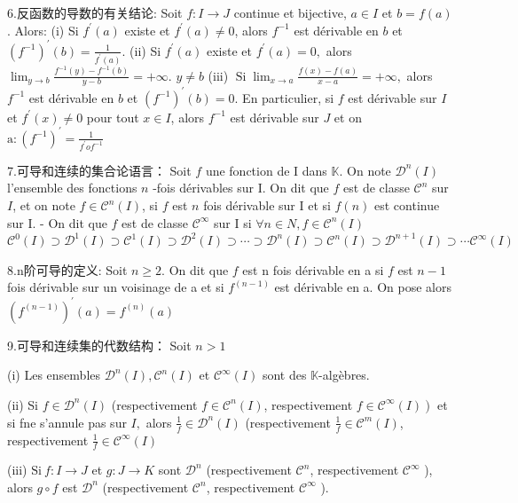 \documentclass[12pt]{book}
\theoremstyle{definition}\newtheorem{dfn}{Définition}[chapter]
\theoremstyle{plain}\newtheorem{thm}{Théorème}[chapter]
\theoremstyle{plain}\newtheorem{prp}{Proposition}[chapter]
\theoremstyle{plain}\newtheorem{lem}{\bf Lemme}[chapter]
\theoremstyle{plain}\newtheorem{axm}{\bf Axiome}[chapter]
\theoremstyle{plain}\newtheorem{lmm}{\bf Lemme}[chapter]
\theoremstyle{plain}\newtheorem{exm}{\bf Example}[chapter]
\theoremstyle{plain}\newtheorem{cor}{\bf Corollaire}[chapter]
\theoremstyle{remark}\newtheorem{rem}{Remarque}[chapter]
\begin{document}
6.反函数的导数的有关结论:
Soit $f: I \rightarrow J$ continue et bijective, $a \in I$ et $b=f(a)$. Alors:
(i) Si $f^{\prime}(a)$ existe et $f^{\prime}(a) \neq 0$, alors $f^{-1}$ est dérivable en $b$ et $\left(f^{-1}\right)^{\prime}(b)=\frac{1}{f^{\prime}(a)}$.
(ii) Si $f^{\prime}(a)$ existe et $f^{\prime}(a)=0,$ alors $\lim _{y \rightarrow b} \frac{f^{-1}(y)-f^{-1}(b)}{y-b}=+\infty$.
$y \neq b$
(iii) $\operatorname{Si} \lim _{x \rightarrow a} \frac{f(x)-f(a)}{x-a}=+\infty,$ alors $f^{-1}$ est dérivable en $b$ et $\left(f^{-1}\right)^{\prime}(b)=0$.
En particulier, si $f$ est dérivable sur $I$ et $f^{\prime}(x) \neq 0$ pour tout $x \in I$, alors $f^{-1}$ est dérivable sur $J$ et on $\mathrm{a}:\left(f^{-1}\right)^{\prime}=\frac{1}{f^{\prime} o f^{-1}}$

7.可导和连续的集合论语言：
Soit $f$ une fonction de I dans $\mathbb{K}$. On note $\mathcal{D}^{n}(I)$ l'ensemble des fonctions $n$ -fois dérivables sur I. On dit que $f$ est de classe $\mathcal{C}^{n}$ sur $I$, et on note $f \in \mathcal{C}^{n}(I)$, si $f$ est $n$ fois dérivable sur I et si $f(n)$ est continue sur I.
- On dit que $f$ est de classe $\mathcal{C}^{\infty}$ sur I si $\forall n \in N, f \in \mathcal{C}^{n}(I)$
$\mathcal{C}^{0}(I) \supset \mathcal{D}^{1}(I) \supset \mathcal{C}^{1}(I) \supset \mathcal{D}^{2}(I) \supset \cdots \supset \mathcal{D}^{n}(I) \supset \mathcal{C}^{n}(I) \supset \mathcal{D}^{n+1}(I) \supset \cdots \mathcal{C}^{\infty}(I)$

8.n阶可导的定义: Soit $n \geq 2$. On dit que $f$ est $\mathrm{n}$ fois dérivable en a si $f$ est $n-1$ fois dérivable sur un voisinage de a et si $f^{(n-1)}$ est dérivable en a. On pose alors $\left(f^{(n-1)}\right)^{\prime}(a)=f^{(n)}(a)$

9.可导和连续集的代数结构：
Soit $n>1$

(i) Les ensembles $\mathcal{D}^{n}(I), \mathcal{C}^{n}(I)$ et $\mathcal{C}^{\infty}(I)$ sont des $\mathbb{K}$-algèbres.

(ii) Si $f \in \mathcal{D}^{n}(I)$ (respectivement $f \in \mathcal{C}^{n}(I)$, respectivement $\left.f \in \mathcal{C}^{\infty}(I)\right)$ et si fne s'annule pas sur $I,$ alors $\frac{1}{f} \in \mathcal{D}^{n}(I)$ (respectivement $\frac{1}{f} \in \mathcal{C}^{m}(I)$, respectivement $\frac{1}{f} \in \mathcal{C}^{\infty}(I)$

(iii) $\mathrm{Si}\ f: I \rightarrow J$ et $g: J \rightarrow K$ sont $\mathcal{D}^{n}$ (respectivement $\mathcal{C}^{n}$, respectivement $\mathcal{C}^{\infty}$ ), alors $g \circ f$ est $\mathcal{D}^{n}$ (respectivement $\mathcal{C}^{n}$, respectivement $\mathcal{C}^{\infty}$ ).
\end{document}
